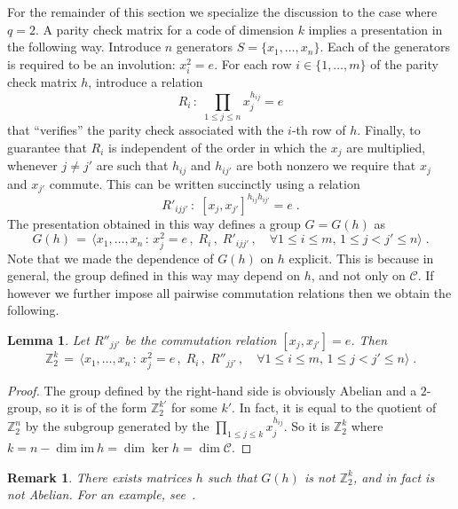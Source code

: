 \documentclass[11pt]{article}
\newtheorem{lemma}[theorem]{Lemma}
\newtheorem{remark}[theorem]{Remark}
\theoremstyle{definition}
\newcommand{\code}{\mathscr{C}}
\newcommand{\Z}{\ensuremath{\mathbb{Z}}}
\begin{document}
For the remainder of this section we specialize the discussion to the case where $q=2$. 
A parity check matrix for a code of dimension $k$ implies a presentation in the following way. Introduce $n$ generators $S=\{x_1,\ldots,x_n\}$. Each of the generators is required to be an involution: $x_i^2=e$. For each row $i\in \{1,\ldots,m\}$ of the parity check matrix $h$, introduce a relation 
\[ R_i\,:\; \prod_{1\leq j \leq n} x_j^{h_{ij}}=e \]
that ``verifies'' the parity check associated with the $i$-th row of $h$. Finally, to guarantee that $R_i$ is independent of the order in which the $x_j$ are multiplied, whenever $j\neq j'$ are such that $h_{ij}$ and $h_{ij'}$ are both nonzero we require that $x_j$ and $x_{j'}$ commute. This can be written succinctly using a relation 
\[ R'_{ijj'}\,:\; [x_j,x_{j'}]^{h_{ij} h_{ij'}}=e\;.\]
The presentation obtained in this way defines a group $G=G(h)$ as 
\begin{equation}\label{eq:def-gh-pres}
 G(h) \,=\, \big\langle x_1,\ldots,x_n \,:\, x_j^2=e\,,\; R_i\,,\; R'_{ijj'}\,,\quad \forall 1\leq i\leq m,\, 1\leq j< j' \leq n\big\rangle\;.
\end{equation}
Note that we made the dependence of $G(h)$ on $h$ explicit. This is because in general, the group defined in this way may depend on $h$, and not only on $\code$. If however we further impose all pairwise commutation relations then we obtain the following. 

\begin{lemma}\label{lem:com-code}
Let $R''_{jj'}$ be the commutation relation $[x_j,x_{j'}]=e$. Then
\[ \Z_2^k \,=\, \big\langle x_1,\ldots,x_n \,:\, x_j^2=e\,,\; R_i\,,\; R''_{jj'}\,,\quad \forall 1\leq i\leq m,\, 1\leq j< j' \leq n\big\rangle\;.\]
\end{lemma}

\begin{proof}
The group defined by the right-hand side is obviously Abelian and a $2$-group, so it is of the form $\Z_2^{k'}$ for some $k'$. In fact, it is equal to the quotient of $\Z_2^n$ by the subgroup generated by the $\prod_{1\leq j \leq k} x_j^{h_{ij}}$. So it is $\Z_2^k$ where $k=n-\dim\textrm{im}\ h = \dim\ker h=\dim \code$.  
\end{proof}

\begin{remark}
There exists matrices $h$ such that $G(h)$ is not $\Z_2^k$, and in fact is not Abelian. For an example, see~\cite[Example 2.16]{paddock2022arkhipov}.  
\end{remark}
\end{document}
